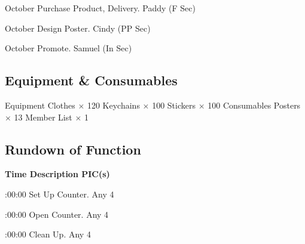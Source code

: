\bTR{}
\eTD{} October
\eTD\bTD Purchase Product, Delivery.
\eTD\bTD Paddy (F Sec)
\eTD\eTR

\bTR{}
\eTD{} October
\eTD\bTD Design Poster.
\eTD\bTD Cindy (PP Sec)
\eTD\eTR

\bTR{}
\eTD{} October
\eTD\bTD Promote.
\eTD\bTD Samuel (In Sec)
\eTD\eTR

\eTABLEbody
\eTABLE

\pagebreak
\subsection{Equipment \& Consumables}
\starttabulate[|l|l|]
\NC{}Equipment\NC\NR
\HL
\NC Clothes \NC $\times$ 120 \NR
\NC Keychains \NC $\times$ 100 \NR
\NC Stickers \NC $\times$ 100 \NR
\HL
\NR
\NC{}Consumables\NC\NR
\HL
\NC Posters \NC $\times$ 13 \NR
\NC Member List \NC $\times$ 1 \NR
\HL
\stoptabulate


\subsection{Rundown of Function}

\setupTABLE[c][1][width=1.25in]
\setupTABLE[c][2][width=3.5in]
\setupTABLE[c][3][width=1.25in]
\bTABLE
\bTABLEhead

\bTR\bTH    \bf{Time}
\eTH\bTH    \bf{Description}
\eTH\bTH    \bf{PIC(s)}
\eTH\eTR

\eTABLEhead
\bTABLEbody

\bTR{}:00:00
\eTD\bTD Set Up Counter.
\eTD\bTD Any 4
\eTD\eTR

\bTR{}:00:00
\eTD\bTD Open Counter.
\eTD\bTD Any 4
\eTD\eTR

\bTR{}:00:00
\eTD\bTD Clean Up.
\eTD\bTD Any 4
\eTD\eTR

\eTABLEbody
\eTABLE

\pagebreak
